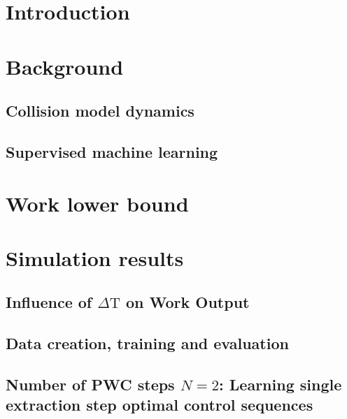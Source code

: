  
\tableofcontents



\mainmatter

\chapter{Introduction}


\chapter{Background} \label{background}
\section{Collision model dynamics} \label{col_model}


%
\section{Supervised machine learning} \label{sml}


\chapter{Work lower bound} \label{lower_bound}


\chapter{Simulation results}
\section{Influence of $\Delta \mathrm{T}$ on Work Output} \label{dep_dt}

\section{Data creation, training and evaluation} \label{data_create}

\section{Number of PWC steps $N=2$: Learning single extraction step optimal control sequences} \label{n_2_ml}

